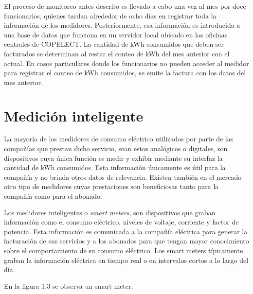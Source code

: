 El proceso de monitoreo antes descrito es llevado a cabo una vez al mes por doce funcionarios, quienes tardan alrededor de ocho días en registrar toda la información de los medidores. Posteriormente, esa información es introducida a una base de datos que funciona en un servidor local ubicado en las oficinas centrales de COPELECT. La cantidad de kWh consumidos que deben ser facturados se determinan al restar el conteo de kWh del mes anterior con el actual. En casos particulares donde los funcionarios no pueden acceder al medidor para registrar el conteo de kWh consumidos, se emite la factura con los datos del mes anterior.


\section{Medición inteligente}

La mayoría de los medidores de consumo eléctrico utilizados por parte de las compañías que prestan dicho servicio, sean estos analógicos o digitales, son dispositivos cuya única función es medir y exhibir mediante su interfaz la cantidad de kWh consumidos. Esta información únicamente es útil para la compañía y no brinda otros datos de relevancia. Existen también en el mercado otro tipo de medidores cuyas prestaciones son beneficiosas tanto para la compañía como para el abonado.

Los medidores inteligentes o \textit{smart meters}, son dispositivos que graban información como el consumo eléctrico, niveles de voltaje, corriente y factor de potencia. Esta información es comunicada a la compañía eléctrica para generar la facturación de sus servicios y a los abonados para que tengan mayor conocimiento sobre el comportamiento de su consumo eléctrico. Los smart meters típicamente graban la información eléctrica en tiempo real o en intervalos cortos a lo largo del día.

En la figura 1.3 se observa un smart meter.

